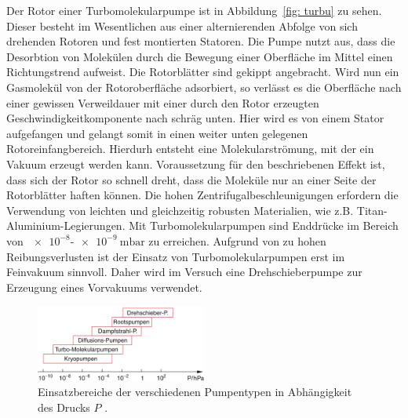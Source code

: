 Der Rotor einer Turbomolekularpumpe ist in Abbildung~\ref{fig: turbu} zu sehen. Dieser besteht im Wesentlichen aus einer %
alternierenden Abfolge von sich drehenden Rotoren und fest montierten Statoren. Die Pumpe nutzt aus, dass die
Desorbtion von Molekülen durch die Bewegung einer Oberfläche im Mittel einen Richtungstrend aufweist. Die Rotorblätter
sind gekippt angebracht. Wird nun ein Gasmolekül von der Rotoroberfläche adsorbiert, so verlässt es die Oberfläche
nach einer gewissen Verweildauer mit einer durch den Rotor erzeugten Geschwindigkeitkomponente nach schräg unten. Hier
wird es von einem Stator aufgefangen und gelangt somit in einen weiter unten gelegenen Rotoreinfangbereich.
Hierdurh entsteht eine Molekularströmung, mit der ein Vakuum erzeugt werden kann. Voraussetzung für den beschriebenen %
Effekt ist, dass sich der Rotor so schnell dreht, dass die Moleküle nur an einer Seite der Rotorblätter haften können.
Die hohen Zentrifugalbeschleunigungen erfordern die Verwendung von leichten und gleichzeitig robusten Materialien, wie z.B.
Titan-Aluminium-Legierungen. Mit Turbomolekularpumpen sind Enddrücke im Bereich von $\num{e-8}$-$\SI{e-9}{\milli\bar}$
zu erreichen. Aufgrund von zu hohen Reibungsverlusten ist der Einsatz von Turbomolekularpumpen erst im Feinvakuum
sinnvoll. Daher wird im Versuch eine Drehschieberpumpe zur Erzeugung eines Vorvakuums verwendet.
\begin{figure}
  \centering
  \includegraphics[width = 0.5\textwidth]{theorie_plots/einsatzbereich_pumpen.png}
  \caption{Einsatzbereiche der verschiedenen Pumpentypen in Abhängigkeit des Drucks $P$ \cite{dem1}.}
  \label{fig: einordnung_pumpen}
\end{figure}

